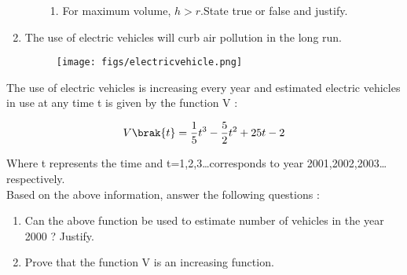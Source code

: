 \begin{enumerate}
\begin{enumerate}[label=(\roman*)]
\begin{enumerate}[label=(\alph*)]
     \item  For maximum volume, $h > r$.State true or false and justify. 
 \end{enumerate}
 \end{enumerate}
  \newpage  
 \item The use of electric vehicles will curb air pollution in the long run.
 
\begin{figure}[!h]
	\begin{center}
\texttt{[image: figs/electricvehicle.png]}
	\end{center}
\caption{}
\label{fig:electricvehicle}
\end{figure}
\end{enumerate}
  
 The use of electric vehicles is increasing every year and estimated electric vehicles in use at any time t is given by the function V :
 
 \begin{align}
    V\brak{t}=\frac{1}{5}t^3 - \frac{5}{2}t^2 + 25t-2 
 \end{align}


 Where t represents the time and t=1,2,3\dots corresponds to year 2001,2002,2003\dots respectively.\\
 Based on the above information, answer the following questions :
 \begin{enumerate}[label=(\roman*)]
     \item Can the above function be used to estimate number of vehicles in the year 2000 ? Justify. 
     \item Prove that the function V is an increasing function.
 \end{enumerate}
 
 
   
  
